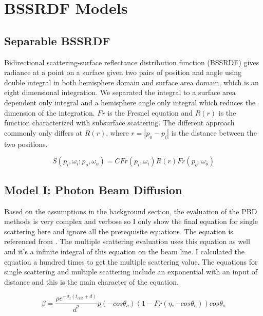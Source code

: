 \documentclass[letterpaper,12pt]{article}
\begin{document}
\section{BSSRDF Models}

\subsection{Separable BSSRDF}
Bidirectional scattering-surface reflectance distribution function (BSSRDF) gives radiance at a point on a surface given two pairs of position and angle using double integral in both hemisphere domain and surface area domain, which is an eight dimensional integration. We separated the integral to a surface area dependent only integral and a hemisphere angle only integral which reduces the dimension of the integration. $Fr$ is the Fresnel equation and $R(r)$ is the function characterized with subsurface scattering. The different approach commonly only differs at $R(r)$, where $r = |p_o - p_i|$ is the distance between the two positions\cite{pharr2016physically}.

\begin{equation}
    S(p_i, \omega_i; p_o, \omega_o) = C Fr(p_i, \omega_i) R(r) Fr(p_o, \omega_o)
\end{equation}

\subsection{Model I: Photon Beam Diffusion}

Based on the assumptions in the background section, the evaluation of the PBD methods is very complex and verbose so I only show the final equation for single scattering here and ignore all the prerequisite equations. The equation is referenced from \cite{habel2013photon}. The multiple scattering evaluation uses this equation as well and it's a infinite integral of this equation on the beam line. I calculated the equation a hundred times to get the multiple scattering value. The equations for single scattering and multiple scattering include an exponential with an input of distance and this is the main character of the equation.

\begin{equation}
    \beta = \frac{\rho e^{-\sigma_t(t_{crit} + d)}}{d^2} p(-cos\theta_o) (1-Fr(\eta, -cos \theta_o)) cos \theta_o
\end{equation}
\end{document}
